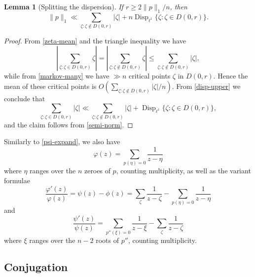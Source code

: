 \documentclass[12pt]{amsart}
\newtheorem{lemma}{Lemma}[section]
\newcommand{\Disp}{\operatorname{Disp}_{\ell^1}}
\begin{document}
\begin{lemma}[Splitting the dispersion]\label{disp-split} If $r \geq 2\|p\|_1/n$, then
\begin{equation}\label{disp-zeta-r}
    \|p\|_1 \ll \sum_{\zeta: \zeta \notin D(0,r)} |\zeta| + n \Disp \{\zeta: \zeta \in D(0,r)\}.
\end{equation}
\end{lemma}

\begin{proof}  From \eqref{zeta-mean} and the triangle inequality we have
$$ \left|\sum_{\zeta: \zeta \in D(0,r)} \zeta\right| = \left|\sum_{\zeta: \zeta \notin D(0,r)} \zeta\right| \leq \sum_{\zeta: \zeta \notin D(0,r)} |\zeta|,$$
while from \eqref{markov-many} we have $\gg n$ critical points $\zeta$ in $D(0,r)$.  Hence the mean of these critical points is $O( \sum_{\zeta: \zeta \notin D(0,r)} |\zeta| / n )$.  From \eqref{disp-upper} we conclude that
$$ \sum_{\zeta: \zeta \in D(0,r)} |\zeta| \ll \sum_{\zeta: \zeta \notin D(0,r)} |\zeta| + \Disp \{\zeta: \zeta \in D(0,r)\},$$
and the claim follows from \eqref{semi-norm}.
\end{proof}

Similarly to \eqref{psi-expand}, we also have
\begin{equation}\label{phi-expand}
    \varphi(z) = \sum_{p(\eta)=0} \frac{1}{z-\eta}
\end{equation}
where $\eta$ ranges over the $n$ zeroes of $p$, counting multiplicity, as well as the variant formulae
\begin{equation}\label{log-phi-expand}
    \frac{\varphi'(z)}{\varphi(z)} = \psi(z) - \phi(z) = \sum_\zeta \frac{1}{z-\zeta} - \sum_{p(\eta)=0} \frac{1}{z-\eta}
\end{equation}
and
\begin{equation}\label{log-psi-expand}
    \frac{\psi'(z)}{\psi(z)} = \sum_{p''(\xi)=0} \frac{1}{z-\xi} - \sum_{\zeta} \frac{1}{z-\zeta}
\end{equation}
where $\xi$ ranges over the $n-2$ roots of $p''$, counting multiplicity.

\subsection{Conjugation}\label{conj-sec}
\end{document}
